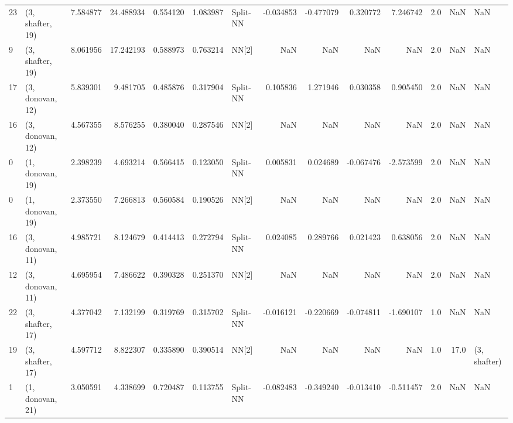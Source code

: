 \begin{tabular}{llrrrrlrrrrrrl}
23 &  (3, shafter, 19) &  7.584877 &  24.488934 &   0.554120 &  1.083987 &    Split-NN &       -0.034853 &     -0.477079 &       0.320772 &     7.246742 &            2.0 &    NaN &              NaN \\
9  &  (3, shafter, 19) &  8.061956 &  17.242193 &   0.588973 &  0.763214 &       NN[2] &             NaN &           NaN &            NaN &          NaN &            2.0 &    NaN &              NaN \\
17 &  (3, donovan, 12) &  5.839301 &   9.481705 &   0.485876 &  0.317904 &    Split-NN &        0.105836 &      1.271946 &       0.030358 &     0.905450 &            2.0 &    NaN &              NaN \\
16 &  (3, donovan, 12) &  4.567355 &   8.576255 &   0.380040 &  0.287546 &       NN[2] &             NaN &           NaN &            NaN &          NaN &            2.0 &    NaN &              NaN \\
0  &  (1, donovan, 19) &  2.398239 &   4.693214 &   0.566415 &  0.123050 &    Split-NN &        0.005831 &      0.024689 &      -0.067476 &    -2.573599 &            2.0 &    NaN &              NaN \\
0  &  (1, donovan, 19) &  2.373550 &   7.266813 &   0.560584 &  0.190526 &       NN[2] &             NaN &           NaN &            NaN &          NaN &            2.0 &    NaN &              NaN \\
16 &  (3, donovan, 11) &  4.985721 &   8.124679 &   0.414413 &  0.272794 &    Split-NN &        0.024085 &      0.289766 &       0.021423 &     0.638056 &            2.0 &    NaN &              NaN \\
12 &  (3, donovan, 11) &  4.695954 &   7.486622 &   0.390328 &  0.251370 &       NN[2] &             NaN &           NaN &            NaN &          NaN &            2.0 &    NaN &              NaN \\
22 &  (3, shafter, 17) &  4.377042 &   7.132199 &   0.319769 &  0.315702 &    Split-NN &       -0.016121 &     -0.220669 &      -0.074811 &    -1.690107 &            1.0 &    NaN &              NaN \\
19 &  (3, shafter, 17) &  4.597712 &   8.822307 &   0.335890 &  0.390514 &       NN[2] &             NaN &           NaN &            NaN &          NaN &            1.0 &   17.0 &     (3, shafter) \\
1  &  (1, donovan, 21) &  3.050591 &   4.338699 &   0.720487 &  0.113755 &    Split-NN &       -0.082483 &     -0.349240 &      -0.013410 &    -0.511457 &            2.0 &    NaN &              NaN \\

\end{tabular}
